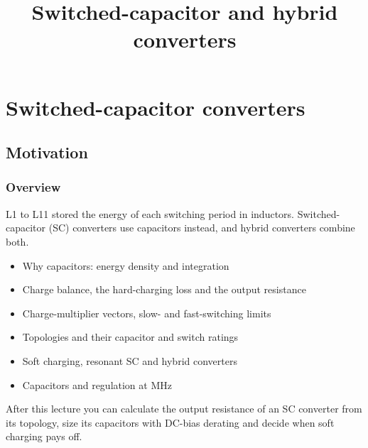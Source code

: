 \title[Switched-capacitor converters]{Switched-capacitor and hybrid converters}
\section{Switched-capacitor converters}

\begin{frame}[plain]
	\titlepage
\end{frame}

\subsection{Motivation}

\begin{frame}
	\frametitle{Overview}
	L1 to L11 stored the energy of each switching period in inductors. Switched-capacitor (SC) converters use capacitors instead, and hybrid converters combine both.
	\begin{itemize}
		\item Why capacitors: energy density and integration
		\item Charge balance, the hard-charging loss and the output resistance
		\item Charge-multiplier vectors, slow- and fast-switching limits
		\item Topologies and their capacitor and switch ratings
		\item Soft charging, resonant SC and hybrid converters
		\item Capacitors and regulation at MHz
	\end{itemize}
	After this lecture you can calculate the output resistance of an SC converter from its topology, size its capacitors with DC-bias derating and decide when soft charging pays off.
\end{frame}

